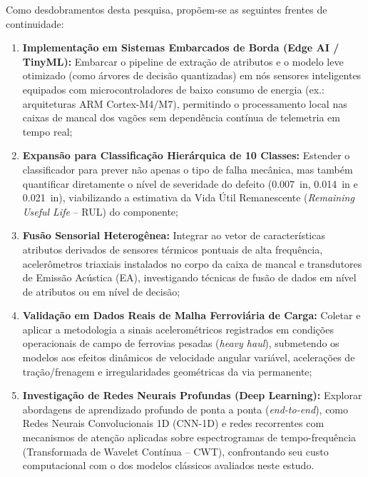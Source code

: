Como desdobramentos desta pesquisa, propõem-se as seguintes frentes de continuidade:
\begin{enumerate}
    \item \textbf{Implementação em Sistemas Embarcados de Borda (Edge AI / TinyML):} Embarcar o pipeline de extração de atributos e o modelo leve otimizado (como árvores de decisão quantizadas) em nós sensores inteligentes equipados com microcontroladores de baixo consumo de energia (ex.: arquiteturas ARM Cortex-M4/M7), permitindo o processamento local nas caixas de mancal dos vagões sem dependência contínua de telemetria em tempo real;
    \item \textbf{Expansão para Classificação Hierárquica de 10 Classes:} Estender o classificador para prever não apenas o tipo de falha mecânica, mas também quantificar diretamente o nível de severidade do defeito (\SI{0.007}{in}, \SI{0.014}{in} e \SI{0.021}{in}), viabilizando a estimativa da Vida Útil Remanescente (\textit{Remaining Useful Life} -- RUL) do componente;
    \item \textbf{Fusão Sensorial Heterogênea:} Integrar ao vetor de características atributos derivados de sensores térmicos pontuais de alta frequência, acelerômetros triaxiais instalados no corpo da caixa de mancal e transdutores de Emissão Acústica (EA), investigando técnicas de fusão de dados em nível de atributos ou em nível de decisão;
    \item \textbf{Validação em Dados Reais de Malha Ferroviária de Carga:} Coletar e aplicar a metodologia a sinais acelerométricos registrados em condições operacionais de campo de ferrovias pesadas (\textit{heavy haul}), submetendo os modelos aos efeitos dinâmicos de velocidade angular variável, acelerações de tração/frenagem e irregularidades geométricas da via permanente;
    \item \textbf{Investigação de Redes Neurais Profundas (Deep Learning):} Explorar abordagens de aprendizado profundo de ponta a ponta (\textit{end-to-end}), como Redes Neurais Convolucionais 1D (CNN-1D) e redes recorrentes com mecanismos de atenção aplicadas sobre espectrogramas de tempo-frequência (Transformada de Wavelet Contínua -- CWT), confrontando seu custo computacional com o dos modelos clássicos avaliados neste estudo.
\end{enumerate}
